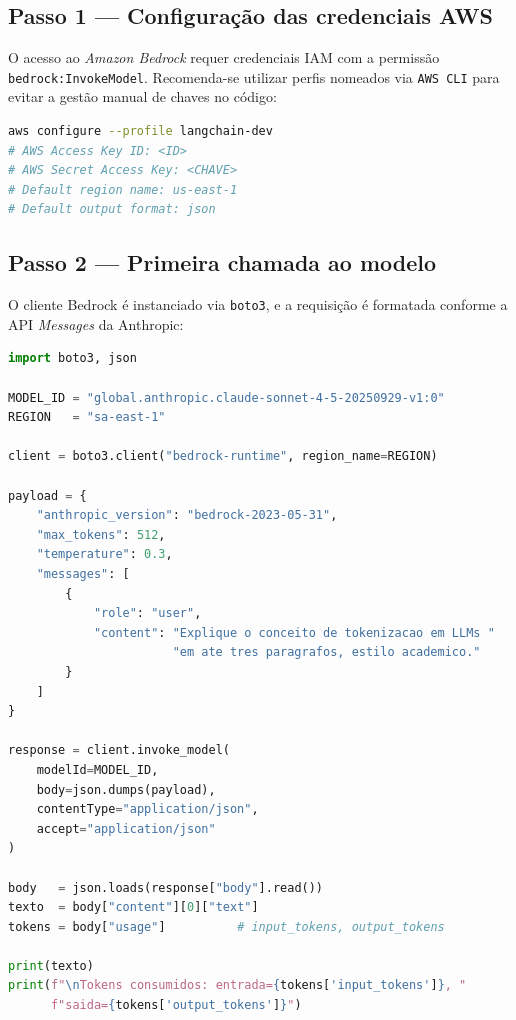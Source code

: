 \subsection{Passo 1 --- Configura\c{c}\~ao das credenciais AWS}

O acesso ao \textit{Amazon Bedrock} requer credenciais IAM com a permiss\~ao
\texttt{bedrock:InvokeModel}. Recomenda-se utilizar perfis nomeados via
\texttt{AWS CLI} para evitar a gest\~ao manual de chaves no c\'odigo:

\begin{lstlisting}[language=bash, caption={Configura\c{c}\~ao de perfil AWS CLI.}]
aws configure --profile langchain-dev
# AWS Access Key ID: <ID>
# AWS Secret Access Key: <CHAVE>
# Default region name: us-east-1
# Default output format: json
\end{lstlisting}

\subsection{Passo 2 --- Primeira chamada ao modelo}

O cliente Bedrock \'e instanciado via \texttt{boto3}, e a
requisi\c{c}\~ao \'e formatada conforme a API \textit{Messages} da
Anthropic:

\begin{lstlisting}[language=Python,
  caption={Primeira chamada ao \textit{Claude Sonnet} via Bedrock.},
  label={lst:bedrock_hello}]
import boto3, json

MODEL_ID = "global.anthropic.claude-sonnet-4-5-20250929-v1:0"
REGION   = "sa-east-1"

client = boto3.client("bedrock-runtime", region_name=REGION)

payload = {
    "anthropic_version": "bedrock-2023-05-31",
    "max_tokens": 512,
    "temperature": 0.3,
    "messages": [
        {
            "role": "user",
            "content": "Explique o conceito de tokenizacao em LLMs "
                       "em ate tres paragrafos, estilo academico."
        }
    ]
}

response = client.invoke_model(
    modelId=MODEL_ID,
    body=json.dumps(payload),
    contentType="application/json",
    accept="application/json"
)

body   = json.loads(response["body"].read())
texto  = body["content"][0]["text"]
tokens = body["usage"]          # input_tokens, output_tokens

print(texto)
print(f"\nTokens consumidos: entrada={tokens['input_tokens']}, "
      f"saida={tokens['output_tokens']}")
\end{lstlisting}


